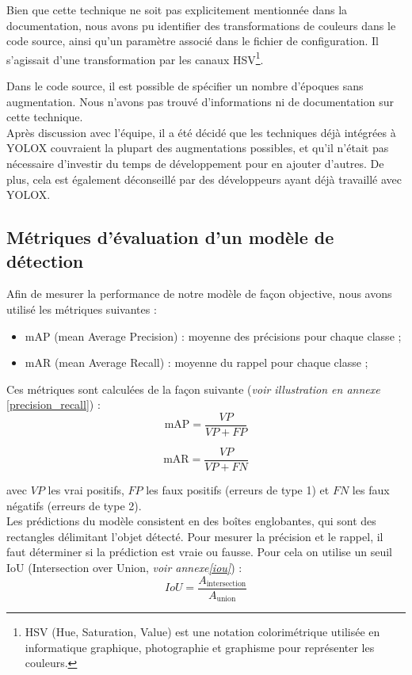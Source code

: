 Bien que cette technique ne soit pas explicitement mentionnée dans la documentation,
nous avons pu identifier des transformations de couleurs dans le code source,
ainsi qu'un paramètre associé dans le fichier de configuration. Il s'agissait 
d'une transformation par les canaux HSV\footnote{HSV (Hue, Saturation, Value) est une notation colorimétrique utilisée en informatique graphique, photographie et graphisme pour représenter les couleurs.}.

Dans le code source, il est possible de spécifier un nombre d'époques sans augmentation. Nous n'avons pas trouvé d'informations ni de documentation sur cette technique.\\

Après discussion avec l'équipe, il a été décidé que les techniques déjà intégrées à YOLOX
couvraient la plupart des augmentations possibles, et qu'il n'était pas nécessaire d'investir
du temps de développement pour en ajouter d'autres. De plus, cela est également déconseillé
par des développeurs ayant déjà travaillé avec YOLOX.\\

\subsection{Métriques d'évaluation d'un modèle de détection}

Afin de mesurer la performance de notre modèle de façon objective,
nous avons utilisé les métriques suivantes :
\begin{itemize}
    \item mAP (mean Average Precision) : moyenne des précisions pour chaque classe ;
    \item mAR (mean Average Recall) : moyenne du rappel pour chaque classe ;
\end{itemize}

Ces métriques sont calculées de la façon suivante (\textit{voir illustration en annexe }
\ref{precision_recall}) :\\

$$
\text{mAP} = \frac{VP}{VP + FP}
$$

$$
\text{mAR} = \frac{VP}{VP + FN}
$$

avec $VP$ les vrai positifs, $FP$ les faux positifs (erreurs de type 1) et 
$FN$ les faux négatifs (erreurs de type 2).\\

Les prédictions du modèle consistent en des boîtes englobantes, qui sont des rectangles délimitant
l'objet détecté. Pour mesurer la précision et le rappel, il faut déterminer si la prédiction
est vraie ou fausse. Pour cela on utilise un seuil IoU (Intersection over Union,
\textit{voir annexe\ref{iou}}) :
\[
    IoU = \frac{A_{\text{intersection}}}{A_{\text{union}}}
\]

